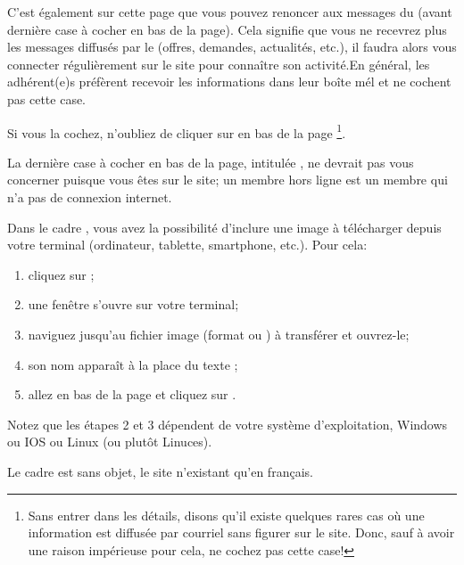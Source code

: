 
C’est également sur cette page que vous pouvez renoncer aux messages du \CdS{} (avant dernière case à cocher en bas de la page). Cela signifie que vous ne recevrez plus les messages diffusés par le \sel{} (offres, demandes, actualités, etc.), il faudra alors vous connecter régulièrement sur le site pour connaître son activité.En général, les adhérent(e)s préfèrent recevoir les informations dans leur boîte mél et ne cochent pas cette case. 

Si vous la cochez, n'oubliez de cliquer sur  en bas de la page%
\footnote{Sans entrer dans les détails, disons qu'il existe quelques rares cas où une information est diffusée par courriel sans figurer sur le site. Donc, sauf à avoir une raison impérieuse pour cela, ne cochez pas cette case!}.

\label{sec:membresHorsLigne}

La dernière case à cocher en bas de la page, intitulée , ne devrait pas vous concerner puisque vous êtes sur le site; un membre hors ligne est un membre qui n'a pas de connexion internet.

\label{sec:insererImage}

Dans le cadre , vous avez la possibilité d’inclure une image à télécharger depuis votre terminal (ordinateur, tablette, smartphone, etc.). Pour cela:
\begin{enumerate}
    \item cliquez sur ;
    \item une fenêtre s’ouvre sur votre terminal;
    \item naviguez jusqu’au fichier image (format  ou ) à transférer et ouvrez-le;
    \item son nom apparaît à la place du texte ;
    \item allez en bas de la page et cliquez sur .
\end{enumerate}
Notez que les étapes 2 et 3 dépendent de votre système d’exploitation, Windows ou IOS ou Linux (ou plutôt Linuces).


Le cadre  est sans objet, le site n’existant qu’en français.

